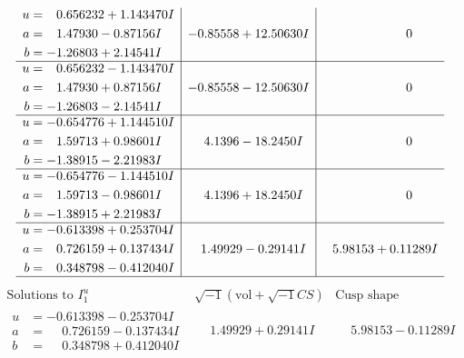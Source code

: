 \documentclass[1p]{elsarticle_modified}
\theoremstyle{definition}
\newcommand{\I}{\sqrt{-1}}
\begin{document}
$$\begin{array}{c|c|c}
\begin{aligned}
u &= \phantom{-}0.656232 + 1.143470 I \\
a &= \phantom{-}1.47930 - 0.87156 I \\
b &= -1.26803 + 2.14541 I\end{aligned}
 & -0.85558 + 12.50630 I & \phantom{-0.000000 } 0 \\ \hline\begin{aligned}
u &= \phantom{-}0.656232 - 1.143470 I \\
a &= \phantom{-}1.47930 + 0.87156 I \\
b &= -1.26803 - 2.14541 I\end{aligned}
 & -0.85558 - 12.50630 I & \phantom{-0.000000 } 0 \\ \hline\begin{aligned}
u &= -0.654776 + 1.144510 I \\
a &= \phantom{-}1.59713 + 0.98601 I \\
b &= -1.38915 - 2.21983 I\end{aligned}
 & \phantom{-}4.1396 - 18.2450 I & \phantom{-0.000000 } 0 \\ \hline\begin{aligned}
u &= -0.654776 - 1.144510 I \\
a &= \phantom{-}1.59713 - 0.98601 I \\
b &= -1.38915 + 2.21983 I\end{aligned}
 & \phantom{-}4.1396 + 18.2450 I & \phantom{-0.000000 } 0 \\ \hline\begin{aligned}
u &= -0.613398 + 0.253704 I \\
a &= \phantom{-}0.726159 + 0.137434 I \\
b &= \phantom{-}0.348798 - 0.412040 I\end{aligned}
 & \phantom{-}1.49929 - 0.29141 I & \phantom{-}5.98153 + 0.11289 I\\
 \hline 
 \end{array}$$\newpage$$\begin{array}{c|c|c}  
\text{Solutions to }I^u_{1}& \I (\text{vol} + \sqrt{-1}CS) & \text{Cusp shape}\\
 \hline 
\begin{aligned}
u &= -0.613398 - 0.253704 I \\
a &= \phantom{-}0.726159 - 0.137434 I \\
b &= \phantom{-}0.348798 + 0.412040 I\end{aligned}
 & \phantom{-}1.49929 + 0.29141 I & \phantom{-}5.98153 - 0.11289 I \\ \hline\begin{aligned}

\end{aligned}
\end{array}$$
\end{document}
